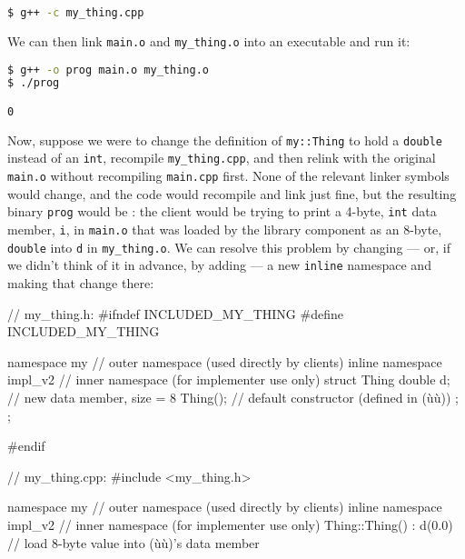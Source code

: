 \begin{lstlisting}[language=bash,style=plain]
$ g++ -c my_thing.cpp
\end{lstlisting}
    
\noindent We can then link \lstinline!main.o! and \lstinline!my_thing.o! into an
executable and run it:

\begin{lstlisting}[language=bash,style=plain]
$ g++ -o prog main.o my_thing.o
$ ./prog

0
\end{lstlisting}
    
\noindent Now, suppose we were to change the definition of \lstinline!my::Thing! to hold a \lstinline!double! instead of an \lstinline!int!, recompile
\lstinline!my_thing.cpp!, and then relink with the original
\lstinline!main.o! without recompiling \lstinline!main.cpp! first. None of the
relevant linker symbols would change, and the code would recompile and link
just fine, but the resulting binary \lstinline!prog! would be
: the client would be trying to print a 4-byte,
\lstinline!int! data member, \lstinline!i!, in \lstinline!main.o! that was loaded
by the library component as an 8-byte, \lstinline!double! into \lstinline!d!
in \lstinline!my_thing.o!. We can resolve this problem by changing --- or,
if we didn't think of it in advance, by adding --- a new \lstinline!inline!
namespace and making that change there:

\begin{emcppshiddenlisting}[emcppsbatch=e5]
// my_thing.h:
#ifndef INCLUDED_MY_THING
#define INCLUDED_MY_THING

namespace my                  // outer namespace (used directly by clients)
{
    inline namespace impl_v2  // inner namespace (for implementer use only)
    {
        struct Thing
        {
            double d; // new data member, size = 8
            Thing();  // default constructor (defined in (ù{}ù))
        };
    };
}

#endif
\end{emcppshiddenlisting}
\begin{emcppslisting}[emcppsbatch=e5]
// my_thing.cpp:
#include <my_thing.h>

namespace my                     // outer namespace (used directly by clients)
{
    inline namespace impl_v2     // inner namespace (for implementer use only)
    {
        Thing::Thing() : d(0.0)  // load 8-byte value into (ù{}ù)'s data member
        {
        }
    }
}
\end{emcppslisting}
    
